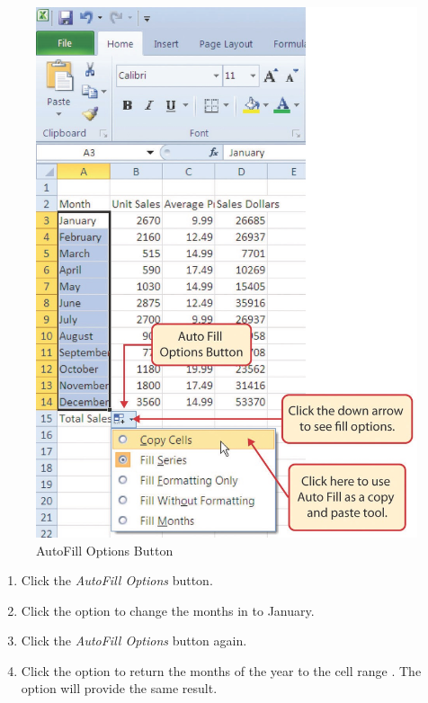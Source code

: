 \begin{figure}[H]
	\centering
	\includegraphics[width=\maxwidth{.95\linewidth}]{gfx/ch01_fig20}
	\caption{AutoFill Options Button}
	\label{01:fig20}
\end{figure}

\begin{enumbox}
	\begin{enumerate}
		\item Click the \textit{AutoFill Options} button.
		\item Click the  option to change the months in   to January.
		\item Click the \textit{AutoFill Options} button again.
		\item Click the  option to return the months of the year to the cell range . The  option will provide the same result.
	\end{enumerate}
\end{enumbox}

